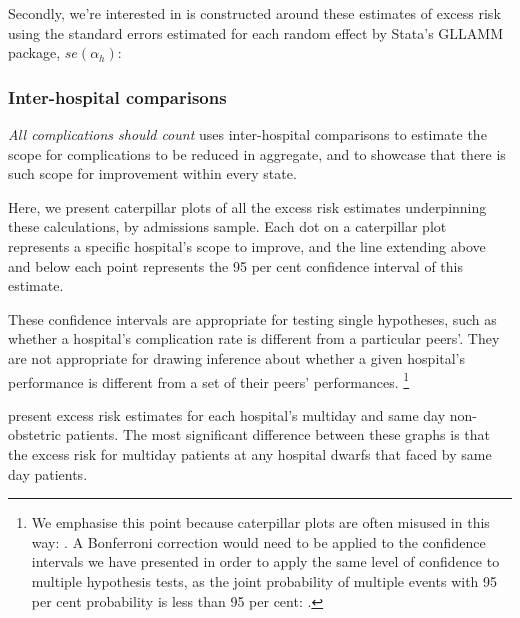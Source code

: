 \documentclass[submission]{grattan}
\newcommand*{\myTitle}{All complications should count}
\begin{document}
Secondly, we're interested in is constructed around these estimates of excess risk using the standard errors estimated for each random effect by Stata's GLLAMM package, \(se(\alpha_{h})\):

\subsubsection{Inter-hospital comparisons}\label{subsubsec:inter-hospital-comparisons}

\textit{\myTitle} uses inter-hospital comparisons to estimate the scope for complications to be reduced in aggregate, and to showcase that there is such scope for improvement within every state.

Here, we present caterpillar plots of all the excess risk estimates underpinning these calculations, by admissions sample.
Each dot on a caterpillar plot represents a specific hospital's scope to improve, and the line extending above and below each point represents the 95 per cent confidence interval of this estimate.

These confidence intervals are appropriate for testing single hypotheses, such as whether a hospital's complication rate is different from a particular peers'.
They are not appropriate for drawing inference about whether a given hospital's performance is different from a set of their peers' performances.%
	\footnote{We emphasise this point because caterpillar plots are often misused in this way: \textcite{Moran_2014}.
	A Bonferroni correction would need to be applied to the confidence intervals we have presented in order to apply the same level of confidence to multiple hypothesis tests, as the joint probability of multiple events with 95 per cent probability is less than 95 per cent: \textcite{Dunn_1959}.}

present excess risk estimates for each hospital's multiday and same day non-obstetric patients.
The most significant difference between these graphs is that the excess risk for multiday patients at any hospital dwarfs that faced by same day patients.
\end{document}
